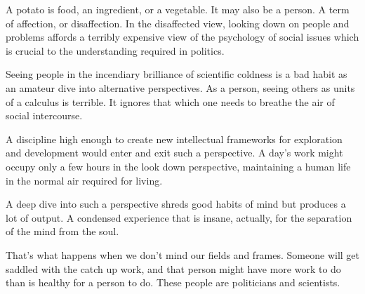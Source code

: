 

A potato is food, an ingredient, or a vegetable.  It may also be a
person.  A term of affection, or disaffection.  In the disaffected
view, looking down on people and problems affords a terribly expensive
view of the psychology of social issues which is crucial to the
understanding required in politics.

Seeing people in the incendiary brilliance of scientific coldness is a
bad habit as an amateur dive into alternative perspectives.  As a
person, seeing others as units of a calculus is terrible.  It ignores
that which one needs to breathe the air of social intercourse.

A discipline high enough to create new intellectual frameworks for
exploration and development would enter and exit such a perspective.
A day's work might occupy only a few hours in the look down
perspective, maintaining a human life in the normal air required for
living.

A deep dive into such a perspective shreds good habits of mind but
produces a lot of output.  A condensed experience that is insane,
actually, for the separation of the mind from the soul.  

That's what happens when we don't mind our fields and frames.  Someone
will get saddled with the catch up work, and that person might have
more work to do than is healthy for a person to do.  These people are
politicians and scientists.

\bye
